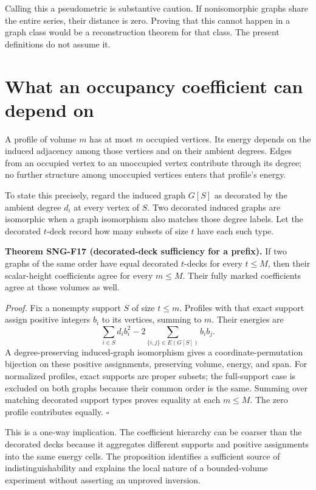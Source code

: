 \documentclass[
  11pt,
  a4paper,
]{report}
\begin{document}
Calling this a pseudometric is substantive caution. If nonisomorphic
graphs share the entire series, their distance is zero. Proving that
this cannot happen in a graph class would be a reconstruction theorem
for that class. The present definitions do not assume it.

\hypertarget{what-an-occupancy-coefficient-can-depend-on}{%
\section{What an occupancy coefficient can depend
on}\label{what-an-occupancy-coefficient-can-depend-on}}

A profile of volume \(m\) has at most \(m\) occupied vertices. Its
energy depends on the induced adjacency among those vertices and on
their ambient degrees. Edges from an occupied vertex to an unoccupied
vertex contribute through its degree; no further structure among
unoccupied vertices enters that profile's energy.

To state this precisely, regard the induced graph \(G[S]\) as decorated
by the ambient degree \(d_i\) at every vertex of \(S\). Two decorated
induced graphs are isomorphic when a graph isomorphism also matches
those degree labels. Let the decorated \(t\)-deck record how many
subsets of size \(t\) have each such type.

\textbf{Theorem SNG-F17 (decorated-deck sufficiency for a prefix).} If
two graphs of the same order have equal decorated \(t\)-decks for every
\(t\le M\), then their scalar-height coefficients agree for every
\(m\le M\). Their fully marked coefficients agree at those volumes as
well.

\emph{Proof.} Fix a nonempty support \(S\) of size \(t\le m\). Profiles
with that exact support assign positive integers \(b_i\) to its
vertices, summing to \(m\). Their energies are \[
\sum_{i\in S}d_i b_i^2
-2\sum_{\{i,j\}\in E(G[S])}b_i b_j.
\] A degree-preserving induced-graph isomorphism gives a
coordinate-permutation bijection on these positive assignments,
preserving volume, energy, and span. For normalized profiles, exact
supports are proper subsets; the full-support case is excluded on both
graphs because their common order is the same. Summing over matching
decorated support types proves equality at each \(m\le M\). The zero
profile contributes equally. \(\square\)

This is a one-way implication. The coefficient hierarchy can be coarser
than the decorated decks because it aggregates different supports and
positive assignments into the same energy cells. The proposition
identifies a sufficient source of indistinguishability and explains the
local nature of a bounded-volume experiment without asserting an
unproved inversion.
\end{document}
